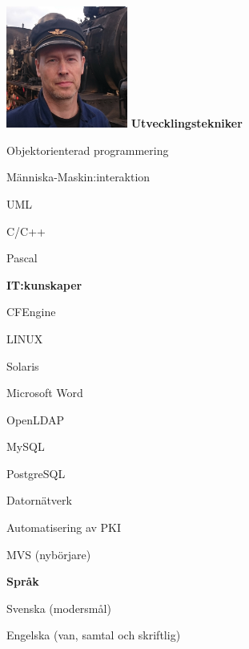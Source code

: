 \documentclass[a4paper,swedish,10pt]{article}
\begin{document}
\begin{minipage}[t]{0.27\textwidth}
  \raggedleft%
  \vspace{-\topskip}
  \includegraphics[height=4cm]{bild.jpg}
  \textbf{Utvecklingstekniker}
  \begin{description}[nosep]
    \raggedleft\setlength\itemsep{0.1ex}\small%
  \item Objektorienterad programmering
  \item Människa-Maskin:interaktion
  \item UML
  \item C/C++
  \item Pascal
  \end{description}
  \vspace{0.5cm}
  \textbf{IT:kunskaper}
  \begin{description}[nosep]
    \raggedleft\setlength\itemsep{0.1ex}\small%
  \item CFEngine
  \item LINUX
  \item Solaris
  \item Microsoft Word
  \item OpenLDAP
  \item MySQL
  \item PostgreSQL
  \item Datornätverk
  \item Automatisering av PKI
  \item MVS (nybörjare)
  \end{description}
  \vspace{0.5cm}
  \textbf{Språk}
  \begin{description}[nosep,itemsep=0.1ex]
    \raggedleft\small%
  \item Svenska (modersmål)
  \item Engelska (van, samtal och skriftlig)

\end{description}
\end{minipage}
\end{document}
